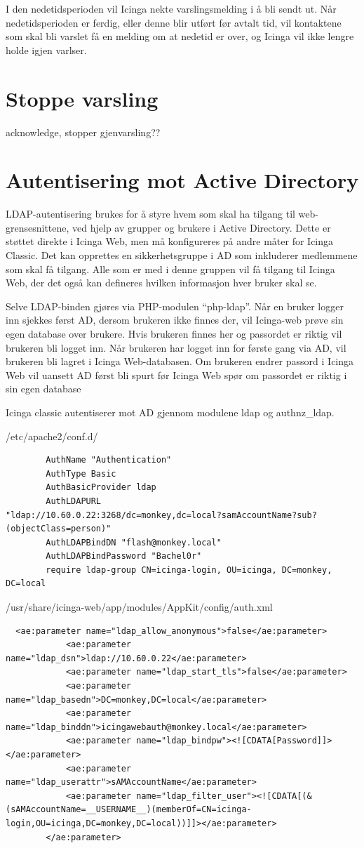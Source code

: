 I den nedetidsperioden vil Icinga nekte varslingsmelding i å bli sendt ut. Når nedetidsperioden er ferdig, eller denne blir utført før avtalt tid, vil kontaktene som skal bli varslet få en melding om at nedetid er over, og Icinga vil ikke lengre holde igjen varlser.

\section{Stoppe varsling}
acknowledge, stopper gjenvarsling??
\section{Autentisering mot Active Directory} 
LDAP-autentisering brukes for å styre hvem som skal ha tilgang til web-grensesnittene, ved hjelp av grupper og brukere i Active Directory. Dette er støttet direkte i Icinga Web, men må konfigureres på andre måter for Icinga Classic. Det kan opprettes en sikkerhetsgruppe i AD som inkluderer medlemmene som skal få tilgang. Alle som er med i denne gruppen vil få tilgang til Icinga Web, der det også kan defineres hvilken informasjon hver bruker skal se. 

Selve LDAP-binden gjøres via PHP-modulen “php-ldap”. Når en bruker logger inn sjekkes først AD, dersom brukeren ikke finnes der, vil Icinga-web prøve sin egen database over brukere. Hvis brukeren finnes her og passordet er riktig vil brukeren bli logget inn. Når brukeren har logget inn for første gang via AD, vil brukeren bli lagret i Icinga Web-databasen. Om brukeren endrer passord i Icinga Web vil uansett AD først bli spurt før Icinga Web spør om passordet er riktig i sin egen database

Icinga classic autentiserer mot AD gjennom modulene ldap og authnz\_ldap.

/etc/apache2/conf.d/
\begin{lstlisting}
        AuthName "Authentication"
        AuthType Basic
        AuthBasicProvider ldap
        AuthLDAPURL
"ldap://10.60.0.22:3268/dc=monkey,dc=local?samAccountName?sub?(objectClass=person)"
        AuthLDAPBindDN "flash@monkey.local"
        AuthLDAPBindPassword "Bachel0r"
        require ldap-group CN=icinga-login, OU=icinga, DC=monkey, DC=local
\end{lstlisting}

/usr/share/icinga-web/app/modules/AppKit/config/auth.xml
\begin{lstlisting}
  <ae:parameter name="ldap_allow_anonymous">false</ae:parameter>
            <ae:parameter name="ldap_dsn">ldap://10.60.0.22</ae:parameter>
            <ae:parameter name="ldap_start_tls">false</ae:parameter>
            <ae:parameter name="ldap_basedn">DC=monkey,DC=local</ae:parameter>
            <ae:parameter name="ldap_binddn">icingawebauth@monkey.local</ae:parameter>
            <ae:parameter name="ldap_bindpw"><![CDATA[Password]]></ae:parameter>
            <ae:parameter name="ldap_userattr">sAMAccountName</ae:parameter>
            <ae:parameter name="ldap_filter_user"><![CDATA[(&(sAMAccountName=__USERNAME__)(memberOf=CN=icinga-login,OU=icinga,DC=monkey,DC=local))]]></ae:parameter>
        </ae:parameter>
\end{lstlisting}

